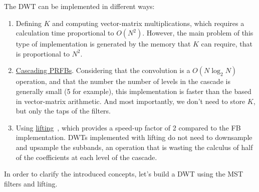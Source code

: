 The DWT can be implemented in different ways:
\begin{enumerate}
\item Defining $K$ and computing vector-matrix multiplications, which
  requires a calculation time proportional to $O(N^2)$. However, the
  main problem of this type of implementation is generated by the
  memory that $K$ can require, that is proportional to $N^2$.
\item
  \href{https://en.wikipedia.org/wiki/Discrete_wavelet_transform#Cascading_and_filter_banks}{Cascading
    PRFBs}. Considering that the convolution is a $O(N\log_2N)$
  operation, and that the number the number of levels in the cascade
  is generally small (5 for example), this implementation is faster
  than the based in vector-matrix arithmetic. And most importantly, we
  don't need to store $K$, but only the taps of the filters.
\item Using
  \href{https://en.wikipedia.org/wiki/Lifting_scheme}{lifting}~\cite{sweldens1997building},
  which provides a speed-up factor of 2 compared to the FB
  implementation. DWTs implemented with lifting do not need to
  downsample and upsample the subbands, an operation that is wasting
  the calculus of half of the coefficients at each level of the
  cascade.
\end{enumerate}

In order to clarify the introduced concepts, let's build a DWT using
the MST filters and lifting.

